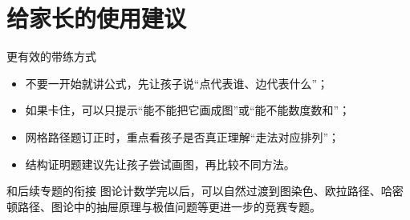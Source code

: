 \documentclass[11pt,a4paper,fontset=fandol]{ctexart}
\begin{document}
\section{给家长的使用建议}

\begin{warnbox}{更有效的带练方式}
\begin{itemize}
  \item 不要一开始就讲公式，先让孩子说“点代表谁、边代表什么”；
  \item 如果卡住，可以只提示“能不能把它画成图”或“能不能数度数和”；
  \item 网格路径题订正时，重点看孩子是否真正理解“走法对应排列”；
  \item 结构证明题建议先让孩子尝试画图，再比较不同方法。
\end{itemize}
\end{warnbox}

\begin{infobox}{和后续专题的衔接}
图论计数学完以后，可以自然过渡到图染色、欧拉路径、哈密顿路径、图论中的抽屉原理与极值问题等更进一步的竞赛专题。
\end{infobox}
\end{document}
